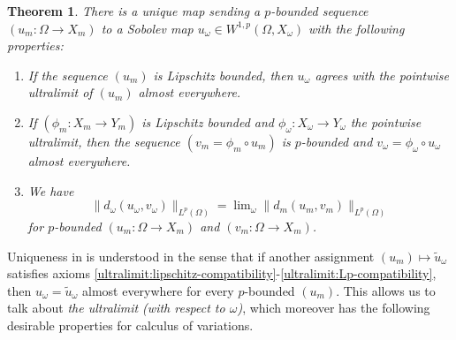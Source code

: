 \documentclass[a4paper,leqno]{amsart}
\numberwithin{equation}{section}
\newtheorem{theorem}{Theorem}[section]
\theoremstyle{remark}
\theoremstyle{remark}
\begin{document}
\begin{theorem}\label{theorem-ultralimit-construction}
There is a unique map sending a $p$-bounded sequence $( u_m \colon \Omega \to X_m )$ to a Sobolev map $u_\omega\in W^{1,p}(\Omega, X_\omega )$ with the following properties:
 \begin{enumerate}
     \item\label{ultralimit:lipschitz-compatibility} If the sequence $(u_m)$ is Lipschitz bounded, then $u_\omega$ agrees with the pointwise ultralimit of $(u_m)$ almost everywhere.
     \item\label{ultralimit:postcomposition-compatibility} If $(\phi_m \colon X_m \to Y_m)$ is Lipschitz bounded and $\phi_\omega \colon X_\omega \to Y_\omega$ the pointwise ultralimit, then the sequence $( v_m = \phi_m \circ u_m )$ is $p$-bounded and $v_\omega=\phi_\omega\circ u_\omega$ almost everywhere.
     \item\label{ultralimit:Lp-compatibility} We have $$\|d_\omega(u_\omega, v_\omega)\|_{L^p(\Omega)}= \lim\nolimits_\omega \|d_m(u_m, v_m)\|_{L^p(\Omega)}$$ for $p$-bounded $( u_m \colon \Omega \to X_m )$ and $( v_m \colon \Omega \to X_m )$.
 \end{enumerate}
\end{theorem}
Uniqueness in  is understood in the sense that if another assignment $( u_m ) \mapsto \widetilde{u}_\omega$ satisfies axioms \eqref{ultralimit:lipschitz-compatibility}-\eqref{ultralimit:Lp-compatibility}, then $u_\omega = \widetilde{u}_\omega$ almost everywhere for every $p$-bounded $(u_m)$. This allows us to talk about \emph{the ultralimit (with respect to $\omega$)}, which moreover has the following desirable properties for calculus of variations.
\end{document}
